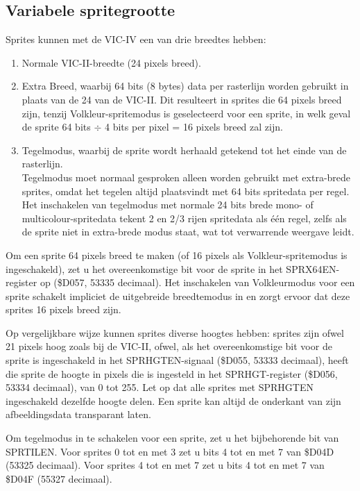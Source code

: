 \subsection{Variabele spritegrootte}

Sprites kunnen met de VIC-IV een van drie breedtes hebben:

\begin{enumerate}
\item Normale VIC-II-breedte (24 pixels breed).\item Extra Breed, waarbij 64 bits (8 bytes) data per rasterlijn worden gebruikt in plaats van de 24 van de VIC-II. Dit resulteert in sprites die 64 pixels breed zijn, tenzij Volkleur-spritemodus is geselecteerd voor een sprite, in welk geval de sprite 64 bits $\div$ 4 bits per pixel = 16 pixels breed zal zijn.\item Tegelmodus, waarbij de sprite wordt herhaald getekend tot het einde van de rasterlijn. \\  Tegelmodus moet normaal gesproken alleen worden gebruikt met extra-brede sprites, omdat het tegelen altijd plaatsvindt met 64 bits spritedata per regel. Het inschakelen van tegelmodus met normale 24 bits brede mono- of multicolour-spritedata tekent 2 en 2/3 rijen spritedata als één regel, zelfs als de sprite niet in extra-brede modus staat, wat tot verwarrende weergave leidt.
\end{enumerate}

Om een sprite 64 pixels breed te maken (of 16 pixels als Volkleur-spritemodus is ingeschakeld), zet u het overeenkomstige bit voor de sprite in het SPRX64EN-register op (\$D057, 53335 decimaal). Het inschakelen van Volkleurmodus voor een sprite schakelt impliciet de uitgebreide breedtemodus in en zorgt ervoor dat deze sprites 16 pixels breed zijn.

Op vergelijkbare wijze kunnen sprites diverse hoogtes hebben: sprites zijn ofwel 21 pixels hoog zoals bij de VIC-II, ofwel, als het overeenkomstige bit voor de sprite is ingeschakeld in het SPRHGTEN-signaal (\$D055, 53333 decimaal), heeft die sprite de hoogte in pixels die is ingesteld in het SPRHGT-register (\$D056, 53334 decimaal), van 0 tot 255. Let op dat alle sprites met SPRHGTEN ingeschakeld dezelfde hoogte delen. Een sprite kan altijd de onderkant van zijn afbeeldingsdata transparant laten.

Om tegelmodus in te schakelen voor een sprite, zet u het bijbehorende bit van SPRTILEN. Voor sprites 0 tot en met 3 zet u bits 4 tot en met 7 van \$D04D (53325 decimaal). Voor sprites 4 tot en met 7 zet u bits 4 tot en met 7 van \$D04F (55327 decimaal).

